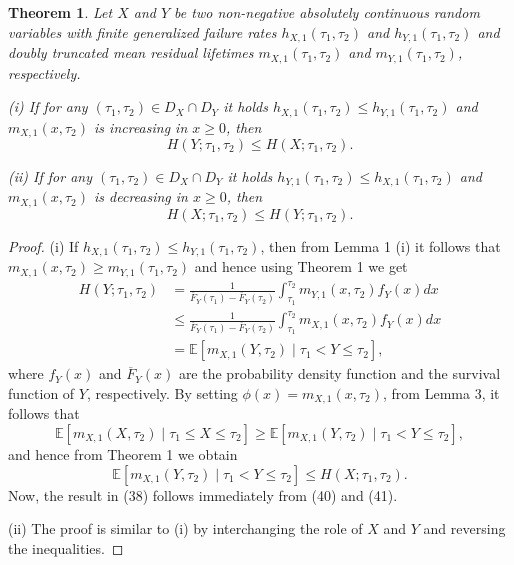 \documentclass[11pt]{article}
\newtheorem{theorem}{Theorem}
\begin{document}
 
\begin{theorem} 
	Let $X$ and $Y$ be two non-negative absolutely continuous random variables with finite generalized failure rates $h_{X,1}(\tau_1,\tau_2)$ and $h_{Y,1}(\tau_1,\tau_2)$ and doubly truncated mean residual lifetimes $m_{X,1}(\tau_1,\tau_2)$ and $m_{Y,1}(\tau_1,\tau_2)$, respectively.
	
	\noindent (i) If for any $(\tau_1, \tau_2) \in D_X \cap D_Y$ it holds $h_{X,1}(\tau_1,\tau_2) \leq h_{Y,1}(\tau_1,\tau_2)$ and $m_{X,1}(x,\tau_2)$ is increasing in $x \geq 0$, then
	\begin{equation}
		H(Y;\tau_1,\tau_2) \leq H(X;\tau_1,\tau_2).
	\end{equation}
	
	\noindent (ii) If for any $(\tau_1, \tau_2) \in D_X \cap D_Y$ it holds $h_{Y,1}(\tau_1,\tau_2) \leq h_{X,1}(\tau_1,\tau_2)$ and $m_{X,1}(x,\tau_2)$ is decreasing in $x \geq 0$, then
	\begin{equation}
		H(X;\tau_1,\tau_2) \leq H(Y;\tau_1,\tau_2).
	\end{equation}
\end{theorem}

\begin{proof} (i) If $h_{X,1}(\tau_1,\tau_2) \leq h_{Y,1}(\tau_1,\tau_2)$, then from Lemma 1 (i) it follows that $m_{X,1}(x,\tau_2) \geq m_{Y,1}(\tau_1,\tau_2)$ and hence using Theorem 1 we get
	\begin{align}
		H(Y;\tau_1,\tau_2) & \textstyle = \frac{1}{\overline{F}_Y(\tau_1) - \overline{F}_Y(\tau_2)} \int_{\tau_1}^{\tau_2} m_{Y,1}(x,\tau_2) f_Y(x) dx \nonumber \\
		& \textstyle \leq \frac{1}{\overline{F}_Y(\tau_1) - \overline{F}_Y(\tau_2)} \int_{\tau_1}^{\tau_2} m_{X,1}(x,\tau_2) f_Y(x) dx \nonumber \\
		& \textstyle = \mathbb{E}[m_{X,1}(Y,\tau_2) \mid \tau_1 < Y \leq \tau_2],
	\end{align}
	where $f_Y(x)$ and $\overline{F}_Y(x)$ are the probability density function and the survival function of $Y$, respectively. By setting $\phi(x)=m_{X,1}(x,\tau_2)$, from Lemma 3, it follows that
	$$ \mathbb{E}[m_{X,1}(X,\tau_2) \mid \tau_1 \leq X \leq \tau_2] \geq \mathbb{E}[m_{X,1}(Y,\tau_2) \mid \tau_1 < Y \leq \tau_2], $$
	and hence from Theorem 1 we obtain
	\begin{equation}
		\mathbb{E}[m_{X,1}(Y,\tau_2) \mid \tau_1 < Y \leq \tau_2] \leq H(X;\tau_1,\tau_2).
	\end{equation}
	Now, the result in (38) follows immediately from (40) and (41).
	
	\noindent (ii) The proof is similar to (i) by interchanging the role of $X$ and $Y$ and reversing the inequalities.
\end{proof}
\end{document}
